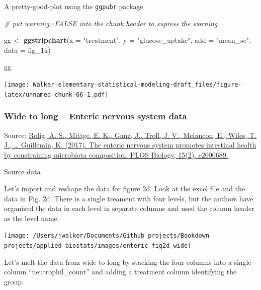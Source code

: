 \documentclass[]{book}
\newenvironment{Shaded}{\begin{snugshade}}{\end{snugshade}}
\newcommand{\CommentTok}[1]{\textcolor[rgb]{0.56,0.35,0.01}{\textit{#1}}}
\newcommand{\DataTypeTok}[1]{\textcolor[rgb]{0.13,0.29,0.53}{#1}}
\newcommand{\KeywordTok}[1]{\textcolor[rgb]{0.13,0.29,0.53}{\textbf{#1}}}
\newcommand{\NormalTok}[1]{#1}
\newcommand{\StringTok}[1]{\textcolor[rgb]{0.31,0.60,0.02}{#1}}
\begin{document}
A pretty-good-plot using the \texttt{ggpubr} package

\begin{Shaded}
\begin{Highlighting}[]
\CommentTok{# put warning=FALSE into the chunk header to supress the warning}

\NormalTok{gg <-}\StringTok{ }\KeywordTok{ggstripchart}\NormalTok{(}\DataTypeTok{x =} \StringTok{"treatment"}\NormalTok{,}
                   \DataTypeTok{y =} \StringTok{"glucose_uptake"}\NormalTok{,}
                   \DataTypeTok{add =} \StringTok{"mean_se"}\NormalTok{,}
                   \DataTypeTok{data =}\NormalTok{ fig_1k)}

\NormalTok{gg}
\end{Highlighting}
\end{Shaded}

\texttt{[image: Walker-elementary-statistical-modeling-draft\_files/figure-latex/unnamed-chunk-66-1.pdf]}

\hypertarget{wide-to-long-enteric-nervous-system-data}{%
\subsubsection{Wide to long -- Enteric nervous system data}\label{wide-to-long-enteric-nervous-system-data}}

Source: \href{https://doi.org/10.1371/journal.pbio.2000689}{Rolig, A. S., Mittge, E. K., Ganz, J., Troll, J. V., Melancon, E., Wiles, T. J., \ldots{} Guillemin, K. (2017). The enteric nervous system promotes intestinal health by constraining microbiota composition. PLOS Biology, 15(2), e2000689.}

\href{https://doi.org/10.1371/journal.pbio.2000689.s008}{Source data}

Let's import and reshape the data for figure 2d. Look at the excel file and the data in Fig. 2d. There is a single treament with four levels, but the authors have organized the data in each level in separate columns and used the column header as the level name.

\texttt{[image: /Users/jwalker/Documents/Github projects/Bookdown projects/applied-biostats/images/enteric\_fig2d\_wide]}

Let's melt the data from wide to long by stacking the four columns into a single column ``neutrophil\_count'' and adding a treatment column identifying the group.
\end{document}
